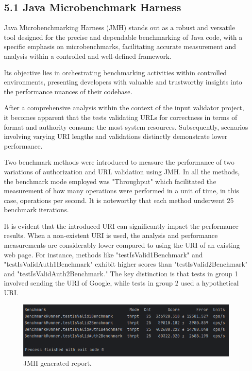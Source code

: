\documentclass{sigchi}
\begin{document}
\subsection{5.1 Java Microbenchmark Harness}
Java Microbenchmarking Harness (JMH)\cite{jmh} stands out as a robust and versatile tool designed for the precise and dependable benchmarking of Java code, with a specific emphasis on microbenchmarks, facilitating accurate measurement and analysis within a controlled and well-defined framework. 

Its objective lies in orchestrating benchmarking activities within controlled environments, presenting developers with valuable and trustworthy insights into the performance nuances of their codebase.

After a comprehensive analysis within the context of the input validator project, it becomes apparent that the tests validating URLs for correctness in terms of format and authority consume the most system resources. Subsequently, scenarios involving varying URI lengths and validations distinctly demonstrate lower performance.

Two benchmark methods were introduced to measure the performance of two variations of authorization and URL validation using JMH. In all the methods, the benchmark mode employed was "Throughput" which facilitated the measurement of how many operations were performed in a unit of time, in this case, operations per second. It is noteworthy that each method underwent 25 benchmark iterations.

It is evident that the introduced URI can significantly impact the performance results. When a non-existent URI is used, the analysis and performance measurements are considerably lower compared to using the URI of an existing web page. For instance, methods like "testIsValid1Benchmark" and "testIsValidAuth1Benchmark" exhibit higher scores than "testIsValid2Benchmark" and "testIsValidAuth2Benchmark." The key distinction is that tests in group 1 involved sending the URI of Google, while tests in group 2 used a hypothetical URI.

\begin{figure}[h!]
    \centering
    \includegraphics[width=1\columnwidth]{benchmark1.png}
    \caption{JMH generated report.}
    \label{fig:enter-label}
\end{figure}
\end{document}
